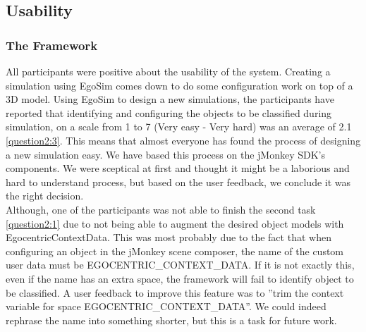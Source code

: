 \subsection{Usability} %
\label{sec:eval_usability}

\subsubsection{The Framework} %
All participants were positive about the usability of the system. Creating a simulation using EgoSim comes down to do some configuration work on top of a 3D model. Using EgoSim to design a new simulations, the participants have reported that identifying and configuring the objects to be classified during simulation, on a scale from 1 to 7 (Very easy - Very hard) was an average of 2.1 \ref{question2:3}. This means that almost everyone has found the process of designing a new simulation easy. We have based this process on the jMonkey SDK's components. We were sceptical at first and thought it might be a laborious and hard to understand process, but based on the user feedback, we conclude it was the right decision.\\

Although, one of the participants was not able to finish the second task \ref{question2:1} due to not being able to augment the desired object models with EgocentricContextData. This was most probably due to the fact that when configuring an object in the jMonkey scene composer, the name of the custom user data must be EGOCENTRIC\_CONTEXT\_DATA. If it is not exactly this, even if the name has an extra space, the framework will fail to identify object to be classified. A user feedback to improve this feature was to ''trim the context variable for space EGOCENTRIC\_CONTEXT\_DATA''. We could indeed rephrase the name into something shorter, but this is a task for future work.\\

